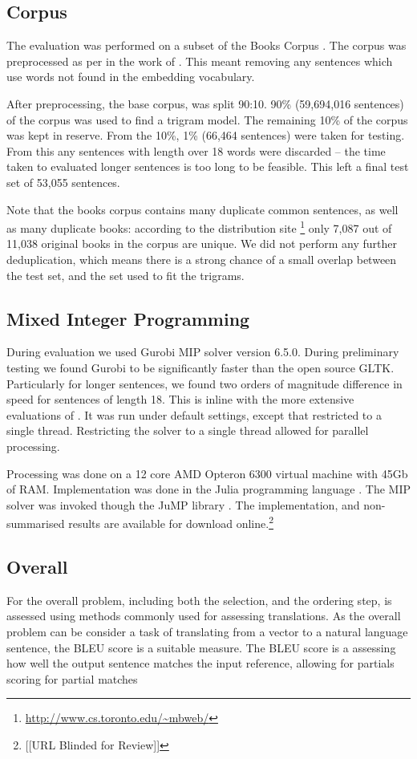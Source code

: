 \documentclass[11pt]{article}
\theoremstyle{plain}
\theoremstyle{definition}
\begin{document}
\subsection{Corpus}
The evaluation was performed on a subset of the Books Corpus \parencite{moviebook}. The corpus was preprocessed as per in the work of \textcite{White2015BOWgen}. This meant removing any sentences which use words not found in the embedding vocabulary.

After preprocessing, the base corpus, was split 90:10. 90\% (59,694,016 sentences) of the corpus was used to find a trigram model. The remaining 10\% of the corpus was kept in reserve. From the 10\%, 1\% (66,464 sentences) were taken for testing. From this any sentences with length over 18 words were discarded -- the time taken to evaluated longer sentences is too long to be feasible. This left a final test set of 53,055 sentences.
 
Note that the books corpus contains many duplicate common sentences, as well as many duplicate books: according to the distribution site \footnote{\url{http://www.cs.toronto.edu/~mbweb/}} only 7,087 out of 11,038 original books in the corpus are unique. We did not perform any further deduplication, which means there is a strong chance of a small overlap between the test set, and the set used to fit the trigrams.
 

\subsection{Mixed Integer Programming}
During evaluation we used Gurobi MIP solver version 6.5.0. During preliminary testing we found Gurobi to be significantly faster than the open source GLTK. Particularly for longer sentences, we found two orders of magnitude difference in speed for sentences of length 18. This is inline with the more extensive evaluations of \textcite{meindl2012analysis}. It was run under default settings, except that restricted to a single thread.
Restricting the solver to a single thread allowed for parallel processing.

Processing was done on a 12 core AMD Opteron 6300 virtual machine with 45Gb of RAM. Implementation was done in the Julia programming language \parencite{Julia}. The MIP solver was invoked though the JuMP library \parencite{jump}. The implementation, and non-summarised results are available for download online.\footnote{[[URL Blinded for Review]]}



\subsection{Overall}
For the overall problem, including both the selection, and the ordering step, is assessed using methods commonly used for assessing translations. As the overall problem can be consider a task of translating from a vector to a natural language sentence, the BLEU  score \parencite{Papineni2002} is a suitable measure. The BLEU score is a assessing how well the output sentence matches the input reference, allowing for partials scoring for partial matches
\end{document}
